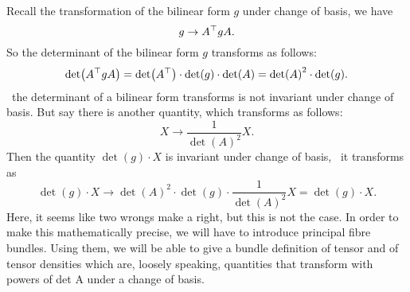 Recall the transformation of the bilinear form \(g\) under change of basis, we have
\begin{equation}
    g \to A^\top g A.
\end{equation}
So the determinant of the bilinear form \(g\) transforms as follows:
\begin{equation}
    \det(A^\top g A) = \det(A^\top) \cdot \det(g) \cdot \det(A) = \det(A)^2 \cdot \det(g).
\end{equation}
\ie\ the determinant of a bilinear form transforms is not invariant under change of basis. But say there is another quantity, which transforms as follows:
\begin{equation}
    X \to \frac{1}{\det(A)^2} X.
\end{equation}
Then the quantity \(\det(g) \cdot X\) is invariant under change of basis, \ie\ it transforms as
\begin{equation}
    \det(g) \cdot X \to \det(A)^2 \cdot \det(g) \cdot \frac{1}{\det(A)^2} X = \det(g) \cdot X.
\end{equation}
Here, it seems like two wrongs make a right, but this is not the case. In order to make this mathematically precise, we will have to introduce principal fibre bundles. Using them, we will be able to give a bundle definition of tensor and of tensor densities which are, loosely speaking, quantities that transform with powers of det A under a change of basis.

